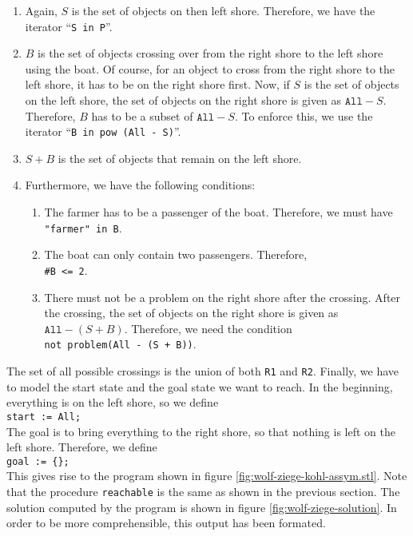 \begin{enumerate}
\item Again, $S$ is the set of objects on then left shore.   Therefore, 
      we have the iterator ``\texttt{S in P}''.
\item $B$ is the set of objects crossing over from the right shore to the left shore using the boat.
      Of course, for an object to cross from the right shore to the left shore, it has to be
      on the right shore first.  Now, if $S$ is the set of objects on the left shore, the
      set  of objects on the right shore is given as $\texttt{All} - S$.    
      Therefore, $B$ has to be a subset of $\texttt{All} - S$.  To enforce this,
      we use the iterator ``\texttt{B in pow (All - S)}''.
\item $S + B$ is the set of objects that remain on the left shore.
\item Furthermore, we have the following  conditions:
      \begin{enumerate}
      \item The farmer has to be a passenger of the boat.  Therefore, we must have
            \\[0.2cm]
            \hspace*{1.3cm}
            \texttt{"farmer" in B}.
      \item The boat can only contain two passengers.  Therefore, 
            \\[0.2cm]
            \hspace*{1.3cm} \texttt{\#B <= 2}.
      \item There must not be a problem on the right shore after the crossing.
            After the crossing, the set of objects on the right shore is given as
            $\mathtt{All} - (S + B)$.  Therefore, we need the condition
            \\[0.2cm]
            \hspace*{1.3cm}
            \texttt{not problem(All - (S + B))}.
      \end{enumerate}
\end{enumerate}
 The set of all possible crossings is the union of
both \texttt{R1} and \texttt{R2}.
Finally, we have to model the start state and the goal state we want to reach.  
In the beginning, everything is on the left shore, so we define
\\[0.2cm]
\hspace*{1.3cm}
\texttt{start := All;}
\\[0.2cm]
The goal is to bring everything to the right shore, so that nothing is left on the left
shore.  Therefore, we define
\\[0.2cm]
\hspace*{1.3cm}
\texttt{goal  := \{\};}
\\[0.2cm]
This gives rise to the program shown in figure  \ref{fig:wolf-ziege-kohl-assym.stl}.
Note that the procedure \texttt{reachable} is the same as shown in the previous section.
The solution computed by the program is shown in figure  \ref{fig:wolf-ziege-solution}.
In order to be more comprehensible, this output has been formated.

